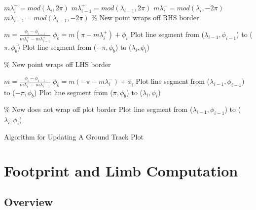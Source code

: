 \begin{center}
\begin{minipage}{6 in}
\begin{small}
\begin{algorithm}[H]

    $m\lambda_i^+ = mod(\lambda_i,2 \pi)$\;
    $m\lambda_{i-1}^+ = mod(\lambda_{i-1},2 \pi)$\;
    $m\lambda_i^- = mod(\lambda_i,-2 \pi)$\;
    $m\lambda_{i-1}^- = mod(\lambda_{i-1},-2 \pi)$\;
\% New point wraps off RHS border\;
          {
           
           $m = \displaystyle\frac{\phi_i - \phi_{i-1}}{m\lambda_i^+ - m\lambda_{i-1}^+}$\;
           $\phi_b = m (\pi - m\lambda_i^+) + \phi_i$\;
           Plot line segment from ($\lambda_{i-1},\phi_{i-1}$) to ($\pi,\phi_b$)\;
           Plot line segment from ($-\pi,\phi_b$) to ($\lambda_i,\phi_i$)\;
          }{
          \% New point wraps off LHS border\;
              {
           
           $m = \displaystyle\frac{\phi_i - \phi_{i-1}}{m\lambda_i^- - m\lambda_{i-1}^- }$\;
           $\phi_b = m (-\pi - m\lambda_i^-) + \phi_i$\;
           Plot line segment from ($\lambda_{i-1},\phi_{i-1}$) to ($-\pi,\phi_b$)\;
           Plot line segment from ($\pi,\phi_b$) to ($\lambda_i,\phi_i$)\;
               }
               \% New does not wrap off plot border \;
  \Else 
           {
                Plot line segment from ($\lambda_{i-1},\phi_{i-1}$) to ($\lambda_i,\phi_i$)\;
            }
    }    
    \hspace{.2 in}
    \label{alg:GroundTrackAlgorithm}\caption{Algorithm for Updating A Ground Track Plot}
\end{algorithm}
\end{small}
\end{minipage}
\end{center}

\section{Footprint and Limb Computation}

\subsection{Overview}


